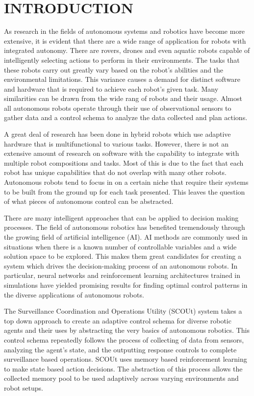 \doublespacing

\chapter*{INTRODUCTION}
As research in the fields of autonomous systems and robotics have become more extensive, it is evident that there are a wide range of application for robots with integrated autonomy.
There are rovers, drones and even aquatic robots capable of intelligently selecting actions to perform in their environments.
The tasks that these robots carry out greatly vary based on the robot's abilities and the environmental limitations.
This variance causes a demand for distinct software and hardware that is required to achieve each robot's given task.
Many similarities can be drawn from the wide rang of robots and their usage.
Almost all autonomous robots operate through their use of observational sensors to gather data and a control schema to analyze the data collected and plan actions.

A great deal of research has been done in hybrid robots which use adaptive hardware that is multifunctional to various tasks.
However, there is not an extensive amount of research on software with the capability to integrate with multiple robot compositions and tasks.
Most of this is due to the fact that each robot has unique capabilities that do not overlap with many other robots.
Autonomous robots tend to focus in on a certain niche that require their systems to be built from the ground up for each task presented.
This leaves the question of what pieces of autonomous control can be abstracted.

There are many intelligent approaches that can be applied to decision making processes.
The field of autonomous robotics has benefited tremendously through the growing field of artificial intelligence (AI).
AI methods are commonly used in situations when there is a known number of controllable variables and a wide solution space to be explored.
This makes them great candidates for creating a system which drives the decision-making process of an autonomous robots.
In particular, neural networks and reinforcement learning architectures trained in simulations have yielded promising results for finding optimal control patterns in the diverse applications of autonomous robots.

The Surveillance Coordination and Operations Utility (SCOUt) system takes a top down approach to create an adaptive control schema for diverse robotic agents and their uses by abstracting the very basics of autonomous robotics.
This control schema repeatedly follows the process of collecting of data from sensors, analyzing the agent's state, and the outputting response controls to complete surveillance based operations.
SCOUt uses memory based reinforcement learning to make state based action decisions.
The abstraction of this process allows the collected memory pool to be used adaptively across varying environments and robot setups.

